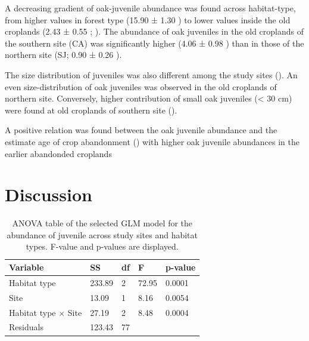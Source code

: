 A decreasing gradient of oak-juvenile abundance was found across habitat-type, from higher values in forest type (15.90 ± 1.30 \juv) to lower values inside the old croplands (2.43 ± 0.55 \juv; ). The abundance of oak juveniles in the old croplands of the southern site (CA) was significantly higher (4.06 ± 0.98 \juv) than in those of the northern site (SJ; 0.90 ± 0.26 \juv). 

The size distribution of juveniles was also different among the study sites (). An even size-distribution of oak juveniles was observed in the old croplands of northern site. Conversely, higher contribution of small oak juveniles (< 30 cm) were found at old croplands of southern site (). 

A positive relation was found between the oak juvenile abundance and the estimate age of crop abandonment () with higher oak juvenile abundances in the earlier abandonded croplands 

\section{Discussion}\label{sec:coloniza:disussion}

\begin{table}
\caption{ANOVA table of the selected GLM model for the abundance of \Qpy juvenile across study sites and habitat types. F-value and p-values are displayed.}
\centering
\begin{tabular}{lllll} 
\toprule
\textbf{Variable}        & \textbf{SS} & \textbf{df} & \textbf{F} & \textbf{p-value}  \\ 
\midrule
Habitat type             & 233.89      & 2           & 72.95      &  0.0001           \\
Site                     & 13.09       & 1           & 8.16       & 0.0054            \\
Habitat type $\times$ Site & 27.19       & 2           & 8.48       & 0.0004            \\
Residuals                & 123.43      & 77          &            &                   \\
\bottomrule
\end{tabular}
\label{tab:coloniza:anova}
\end{table}

